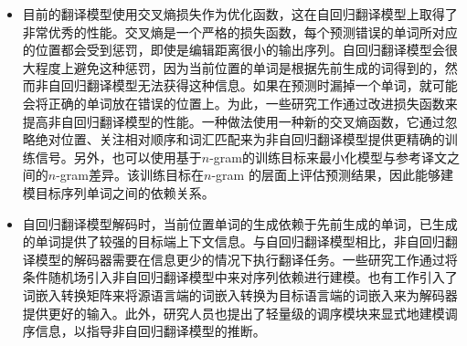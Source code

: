 \begin{itemize}
\vspace{0.5em}
\item 目前的翻译模型使用交叉熵损失作为优化函数，这在自回归翻译模型上取得了非常优秀的性能。交叉熵是一个严格的损失函数，每个预测错误的单词所对应的位置都会受到惩罚，即使是编辑距离很小的输出序列。自回归翻译模型会很大程度上避免这种惩罚，因为当前位置的单词是根据先前生成的词得到的，然而非自回归翻译模型无法获得这种信息。如果在预测时漏掉一个单词，就可能会将正确的单词放在错误的位置上。为此，一些研究工作通过改进损失函数来提高非自回归翻译模型的性能。一种做法使用一种新的交叉熵函数，它通过忽略绝对位置、关注相对顺序和词汇匹配来为非自回归翻译模型提供更精确的训练信号。另外，也可以使用基于$n$-gram的训练目标来最小化模型与参考译文之间的$n$-gram差异。该训练目标在$n$-gram 的层面上评估预测结果，因此能够建模目标序列单词之间的依赖关系。
\vspace{0.5em}
\item 自回归翻译模型解码时，当前位置单词的生成依赖于先前生成的单词，已生成的单词提供了较强的目标端上下文信息。与自回归翻译模型相比，非自回归翻译模型的解码器需要在信息更少的情况下执行翻译任务。一些研究工作通过将条件随机场引入非自回归翻译模型中来对序列依赖进行建模。也有工作引入了词嵌入转换矩阵来将源语言端的词嵌入转换为目标语言端的词嵌入来为解码器提供更好的输入。此外，研究人员也提出了轻量级的调序模块来显式地建模调序信息，以指导非自回归翻译模型的推断。
\vspace{0.5em}
\end{itemize}








